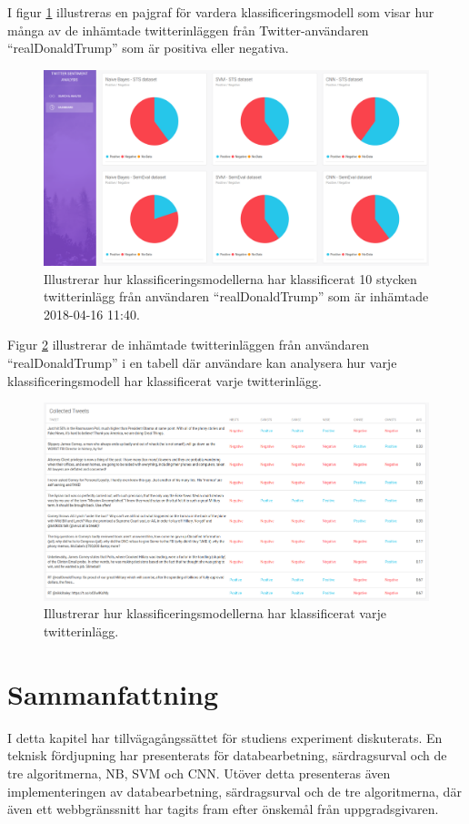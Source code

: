 \documentclass{kaumasters} %
\begin{document}
I figur \ref{fig:gui_search_g} illustreras en pajgraf för vardera klassificeringsmodell som visar hur många av de inhämtade twitterinläggen från Twitter-användaren “realDonaldTrump” som är positiva eller negativa.

\begin{figure}[H]
\includegraphics[width=12cm]{GUI_search_graph}
\centering
\caption{Illustrerar hur klassificeringsmodellerna har klassificerat 10 stycken twitterinlägg från användaren “realDonaldTrump” som är inhämtade 2018-04-16 11:40.}
\label{fig:gui_search_g}
\end{figure}

Figur \ref{fig:gui_search_t} illustrerar de inhämtade twitterinläggen från användaren “realDonaldTrump” i en tabell där användare kan analysera hur varje klassificeringsmodell har klassificerat varje twitterinlägg.

\begin{figure}[H]
\includegraphics[width=12cm]{GUI_search_table}
\centering
\caption{Illustrerar hur klassificeringsmodellerna har klassificerat varje twitterinlägg.}
\label{fig:gui_search_t}
\end{figure}
\section{Sammanfattning}
I detta kapitel har tillvägagångssättet för studiens experiment diskuterats. En teknisk fördjupning har presenterats för databearbetning, särdragsurval och de tre algoritmerna, NB, SVM och CNN. Utöver detta presenteras även implementeringen av databearbetning, särdragsurval och de tre algoritmerna, där även ett webbgränssnitt har tagits fram efter önskemål från uppgradsgivaren.
\end{document}
